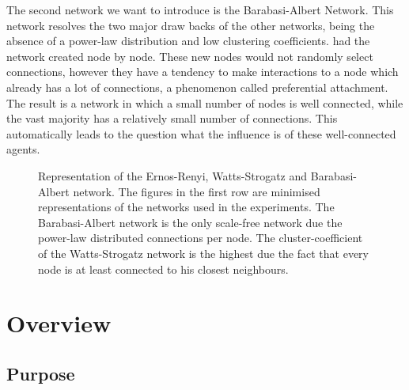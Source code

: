 \documentclass[10pt]{article}
\begin{document}
    The second network we want to introduce is the Barabasi-Albert Network. This network resolves the two major draw backs of the other networks, being the absence of a power-law distribution and low clustering coefficients. \cite{barabasi2009scale} had the network created node by node. These new nodes would not randomly select connections, however they have a tendency to make interactions to a node which already has a lot of connections, a phenomenon called preferential attachment. The result is a network in which a small number of nodes is well connected, while the vast majority has a relatively small number of connections. This automatically leads to the question what the influence is of these well-connected agents.

    \begin{figure}[h]
        \caption{Representation of the Ernos-Renyi, Watts-Strogatz and Barabasi-Albert network. The figures in the first row are minimised representations of the networks used in the experiments. The Barabasi-Albert network is the only scale-free network due the power-law distributed connections per node. The cluster-coefficient of the Watts-Strogatz network is the highest due the fact that every node is at least connected to his closest neighbours. }
        \label{fig:key}
    \end{figure}

    \newpage

    \section{Overview}

    \subsection{Purpose}
\end{document}
